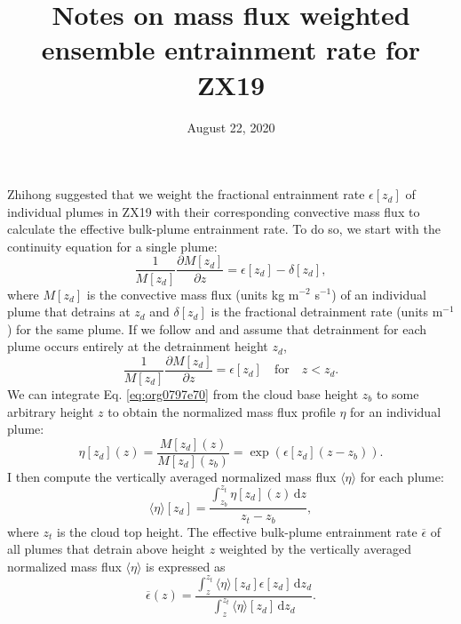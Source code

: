 \documentclass[11pt]{article}
\date{August 22, 2020}
\title{Notes on mass flux weighted ensemble entrainment rate for ZX19}
\begin{document}
\maketitle
Zhihong suggested that we weight the fractional entrainment rate \(\epsilon[z_d]\) of individual plumes in ZX19 with their corresponding convective mass flux to calculate the effective bulk-plume entrainment rate. To do so, we start with the continuity equation for a single plume:
\begin{equation}
\frac{1}{M[z_d]}\frac{\partial M[z_d]}{\partial z} = \epsilon[z_d] - \delta[z_d],
\end{equation}
where \(M[z_d]\) is the convective mass flux (units kg m\(^{-2}\) s\(^{-1}\)) of an individual plume that detrains at \(z_d\) and \(\delta[z_d]\) is the fractional detrainment rate (units m\(^{-1}\)) for the same plume. If we follow \cite{arakawa1974} and \cite{moorthi1992} and assume that detrainment for each plume occurs entirely at the detrainment height \(z_d\),
\begin{equation}
\label{eq:org0797e70}
\frac{1}{M[z_d]}\frac{\partial M[z_d]}{\partial z} = \epsilon[z_d] \quad \mathrm{for} \quad z<z_d.
\end{equation}
We can integrate Eq. \ref{eq:org0797e70} from the cloud base height \(z_b\) to some arbitrary height \(z\) to obtain the normalized mass flux profile \(\eta\) for an individual plume:
\begin{equation}
\eta[z_d](z) = \frac{M[z_d](z)}{M[z_d](z_b)} = \exp(\epsilon[z_d](z-z_b)).
\end{equation}
I then compute the vertically averaged normalized mass flux \(\langle \eta \rangle\) for each plume:
\begin{equation}
\langle\eta\rangle[z_d] = \frac{\int_{z_b}^{z_t}\!\eta[z_d](z)\,\mathrm{d}z}{z_t-z_b},
\end{equation}
where \(z_t\) is the cloud top height. The effective bulk-plume entrainment rate \(\overline{\epsilon}\) of all plumes that detrain above height \(z\) weighted by the vertically averaged normalized mass flux \(\langle\eta\rangle\) is expressed as
\begin{equation}
\overline{\epsilon}(z) = \frac{\int_z^{z_t}\!\langle\eta\rangle[z_d]\epsilon[z_d]\,\mathrm{d}z_d}{\int_z^{z_t}\!\langle\eta\rangle[z_d]\,\mathrm{d}{z_d}}.
\end{equation}



\end{document}
